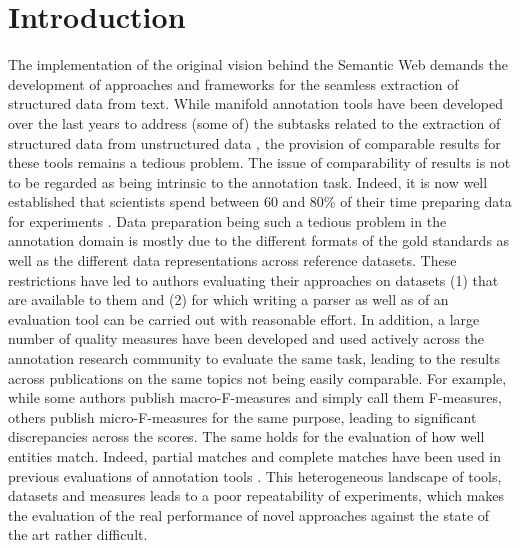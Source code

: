 \section{Introduction}
The implementation of the original vision behind the Semantic Web demands the development of approaches and frameworks for the seamless extraction of structured data from text. 
While manifold annotation tools have been developed over the last years to address (some of) the subtasks related to the extraction of structured data from unstructured data \cite{TagMe2,AIDA,spotlight,milne2008learning,babelfy,piccinno2014tagme,rizzo2014,Steinmetz2013,AGDISTIS_ISWC}, the provision of comparable results for these tools remains a tedious problem. The issue of  comparability of results is not to be regarded as being intrinsic to the annotation task. Indeed, it is now well established that scientists spend between 60 and 80\% of their time preparing data for experiments \cite{GIL2014,jermyn1999preparing,peng2011reproducible}. Data preparation being such a tedious problem in the annotation domain is mostly due to the different formats of the gold standards as well as the different data representations across reference datasets.
These restrictions have led to authors evaluating their approaches on datasets (1) that are available to them and (2) for which writing a parser as well as of an evaluation tool can be carried out with reasonable effort.
In addition, a large number of quality measures have been developed and used actively across the annotation research community to evaluate the same task, leading to the results across publications on the same topics not being easily comparable. For example, while some authors publish macro-F-measures and simply call them F-measures, others publish micro-F-measures for the same purpose, leading to significant discrepancies across the scores. The same holds for the evaluation of how well entities match. Indeed, partial matches and complete matches have been used in previous evaluations of annotation tools \cite{cornolti,FOX}. This heterogeneous landscape of tools, datasets and measures leads to a poor repeatability of experiments, which makes the evaluation of the real performance of novel approaches against the state of the art rather difficult.

